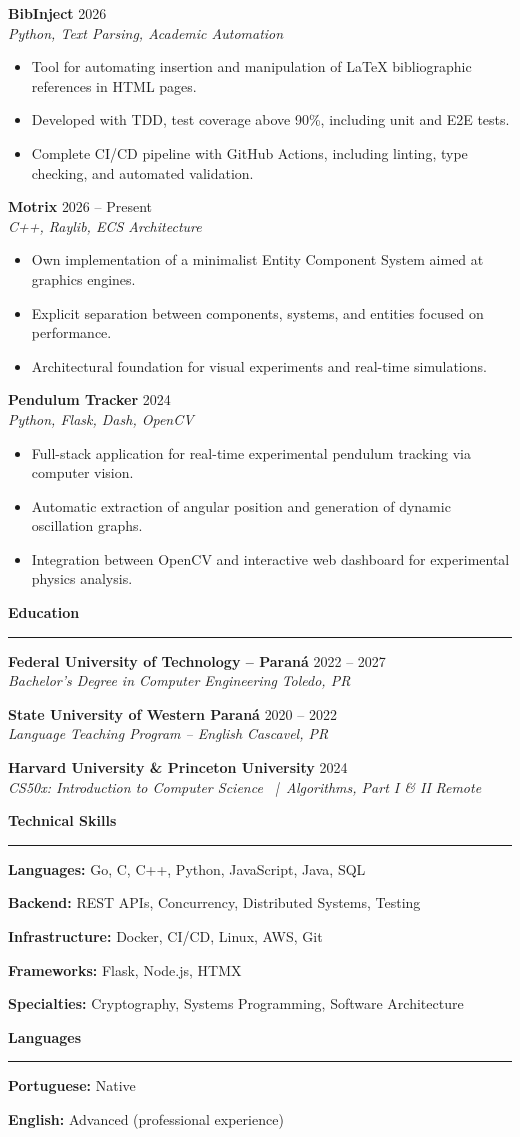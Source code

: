 \documentclass[letterpaper,11pt]{article}
\newcommand{\cvsection}[2][6pt]{
\vspace{#1}
{\large\bfseries\color{cvblue} #2}\\[-6pt]
{\color{cvblue}\rule{\textwidth}{0.4pt}}
\vspace{-6pt}
}
\newcommand{\cvtitle}[2]{
\textbf{#1} \hfill {\color{cvgray}#2}
}
\newcommand{\cvsubtitle}[2]{
\textit{\color{cvgray}#1} \hfill \textit{\color{cvgray}#2}
}
\newcommand{\cventry}[4]{
\cvtitle{#1}{#2}\\
\cvsubtitle{#3}{#4}
\vspace{2pt}
}
\newcommand{\cvbullet}[1]{
\item #1
}
\newcommand{\cvliststart}{
\begin{itemize}
}
\newcommand{\cvlistend}{
\end{itemize}
}
\newcommand{\cvskill}[2]{
\textbf{\color{cvblue}#1:} #2\par
}
\newcommand{\cvlanguage}[2]{
\textbf{\color{cvblue}#1:} #2\par
}
\begin{document}
\cventry
{BibInject}
{2026}
{Python, Text Parsing, Academic Automation}
{}

\cvliststart
\cvbullet{Tool for automating insertion and manipulation of LaTeX bibliographic references in HTML pages.}
\cvbullet{Developed with TDD, test coverage above 90\%, including unit and E2E tests.}
\cvbullet{Complete CI/CD pipeline with GitHub Actions, including linting, type checking, and automated validation.}
\cvlistend

\cventry
{Motrix}
{2026 -- Present}
{C++, Raylib, ECS Architecture}
{}

\cvliststart
\cvbullet{Own implementation of a minimalist Entity Component System aimed at graphics engines.}
\cvbullet{Explicit separation between components, systems, and entities focused on performance.}
\cvbullet{Architectural foundation for visual experiments and real-time simulations.}
\cvlistend

\cventry
{Pendulum Tracker}
{2024}
{Python, Flask, Dash, OpenCV}
{}

\cvliststart
\cvbullet{Full-stack application for real-time experimental pendulum tracking via computer vision.}
\cvbullet{Automatic extraction of angular position and generation of dynamic oscillation graphs.}
\cvbullet{Integration between OpenCV and interactive web dashboard for experimental physics analysis.}
\cvlistend

\cvsection{Education}

\cventry
{Federal University of Technology -- Paraná}
{2022 -- 2027}
{Bachelor's Degree in Computer Engineering}
{Toledo, PR}

\cventry
{State University of Western Paraná}
{2020 -- 2022}
{Language Teaching Program -- English}
{Cascavel, PR}

\cventry
{Harvard University \& Princeton University}
{2024}
{CS50x: Introduction to Computer Science \ |\ Algorithms, Part I \& II}
{Remote}

\cvsection{Technical Skills}

\cvskill{Languages}{Go, C, C++, Python, JavaScript, Java, SQL}
\cvskill{Backend}{REST APIs, Concurrency, Distributed Systems, Testing}
\cvskill{Infrastructure}{Docker, CI/CD, Linux, AWS, Git}
\cvskill{Frameworks}{Flask, Node.js, HTMX}
\cvskill{Specialties}{Cryptography, Systems Programming, Software Architecture}

\cvsection{Languages}

\cvlanguage{Portuguese}{Native}
\cvlanguage{English}{Advanced (professional experience)}
\end{document}
